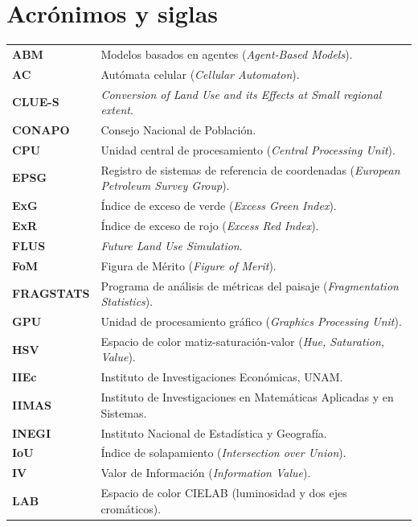 \chapter*{Acrónimos y siglas}

\begin{longtable}{>{\bfseries}p{} p{}}
ABM & Modelos basados en agentes (\textit{Agent-Based Models}). \\[2pt]
AC & Autómata celular (\textit{Cellular Automaton}). \\[2pt]
CLUE-S & \textit{Conversion of Land Use and its Effects at Small regional extent}. \\[2pt]
CONAPO & Consejo Nacional de Población. \\[2pt]
CPU & Unidad central de procesamiento (\textit{Central Processing Unit}). \\[2pt]
EPSG & Registro de sistemas de referencia de coordenadas (\textit{European Petroleum Survey Group}). \\[2pt]
ExG & Índice de exceso de verde (\textit{Excess Green Index}). \\[2pt]
ExR & Índice de exceso de rojo (\textit{Excess Red Index}). \\[2pt]
FLUS & \textit{Future Land Use Simulation}. \\[2pt]
FoM & Figura de Mérito (\textit{Figure of Merit}). \\[2pt]
FRAGSTATS & Programa de análisis de métricas del paisaje (\textit{Fragmentation Statistics}). \\[2pt]
GPU & Unidad de procesamiento gráfico (\textit{Graphics Processing Unit}). \\[2pt]
HSV & Espacio de color matiz-saturación-valor (\textit{Hue, Saturation, Value}). \\[2pt]
IIEc & Instituto de Investigaciones Económicas, UNAM. \\[2pt]
IIMAS & Instituto de Investigaciones en Matemáticas Aplicadas y en Sistemas. \\[2pt]
INEGI & Instituto Nacional de Estadística y Geografía. \\[2pt]
IoU & Índice de solapamiento (\textit{Intersection over Union}). \\[2pt]
IV & Valor de Información (\textit{Information Value}). \\[2pt]
LAB & Espacio de color CIELAB (luminosidad y dos ejes cromáticos). \\[2pt]

\end{longtable}

